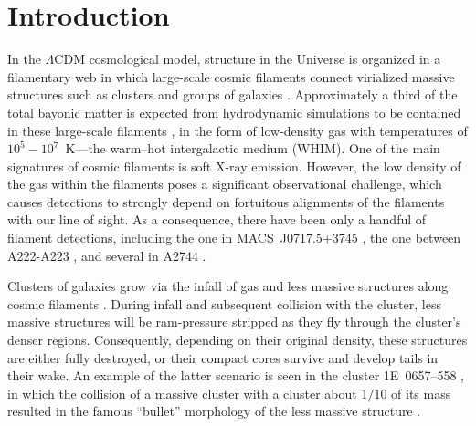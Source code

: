 \section{Introduction}


In the $\Lambda$CDM cosmological model, structure in the Universe is organized in a filamentary web in which large-scale cosmic filaments connect virialized massive structures such as clusters and groups of galaxies \citep[e.g., ][]{Einasto1994}. Approximately a third of the total bayonic matter is expected from hydrodynamic simulations to be contained in these large-scale filaments \citep[e.g.][]{Dave2001}, in the form of low-density gas with temperatures of $10^5-10^7$~K---the warm--hot intergalactic medium (WHIM). One of the main signatures of cosmic filaments is soft X-ray emission. However, the low density of the gas within the filaments poses a significant observational challenge, which causes detections to strongly depend on fortuitous alignments of the filaments with our line of sight. As a consequence, there have been only a handful of filament detections, including the one in MACS~J0717.5+3745 \citep{Ebeling2004}, the one between A222-A223 \citep{Dietrich2005, Werner2008}, and several in A2744 \citep{Eckert2015}.

Clusters of galaxies grow via the infall of gas and less massive structures along cosmic filaments \citep[e.g.,][]{Springel2006}. During infall and subsequent collision with the cluster, less massive structures will be ram-pressure stripped as they fly through the cluster's denser regions. Consequently, depending on their original density, these structures are either fully destroyed, or their compact cores survive and develop tails in their wake. An example of the latter scenario is seen in the cluster 1E~0657--558 \citep{Elvis1992}, in which the collision of a massive cluster with a cluster about $1/10$ of its mass \citep{Springel2007, Mastropietro2008} resulted in the famous ``bullet'' morphology of the less massive structure \citep{Markevitch2002}.

